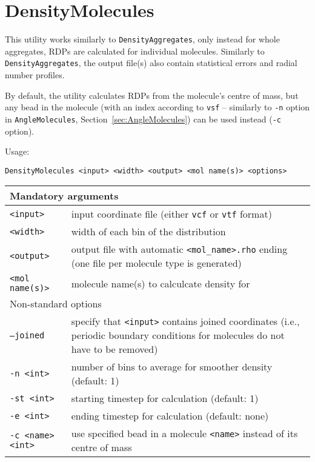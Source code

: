 \section{DensityMolecules} \label{sec:DensityMolecules}

This utility works similarly to \texttt{DensityAggregates}, only instead
for whole aggregates, RDPs are calculated for individual molecules.
Similarly to \texttt{DensityAggregates}, the output file(s) also contain
statistical errors and radial number profiles.

By default, the utility calculates RDPs from the molecule's centre of mass,
but any bead in the molecule (with an index according to \texttt{vsf} --
similarly to \texttt{-n} option in \texttt{AngleMolecules},
Section~\ref{sec:AngleMolecules}) can be used instead (\texttt{-c} option).

Usage:

\vspace{1em}
\noindent
\texttt{DensityMolecules <input> <width> <output> <mol name(s)> <options>}

\noindent
\begin{longtable}{p{}p{}}
  \toprule
  \multicolumn{2}{l}{Mandatory arguments} \\
  \midrule
  \texttt{<input>} & input coordinate file (either \texttt{vcf} or
    \texttt{vtf} format) \\
  \texttt{<width>} & width of each bin of the distribution \\
  \texttt{<output>} & output file with automatic \texttt{<mol\_name>.rho}
    ending (one file per molecule type is generated) \\
  \texttt{<mol name(s)>} & molecule name(s) to calculcate density for \\
  \toprule
  \multicolumn{2}{l}{Non-standard options} \\
  \midrule
  \texttt{--joined} & specify that \texttt{<input>} contains joined
    coordinates (i.e., periodic boundary conditions for molecules do not
    have to be removed) \\
  \texttt{-n <int>} & number of bins to average for smoother density
    (default: 1) \\
  \texttt{-st <int>} & starting timestep for calculation (default: 1) \\
  \texttt{-e <int>} & ending timestep for calculation (default: none) \\
  \texttt{-c <name> <int>} & use specified bead in a molecule
    \texttt{<name>} instead of its centre of mass \\
  \bottomrule
\end{longtable}

